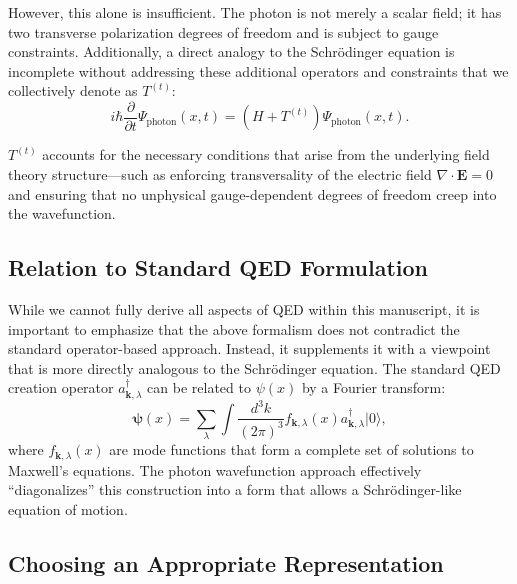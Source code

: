 \documentclass[aps,prl,twocolumn,showpacs,showkeys,superscriptaddress,amsmath,amssymb]{revtex4-2}
\begin{document}
However, this alone is insufficient. The photon is not merely a scalar field; it has two transverse polarization degrees of freedom and is subject to gauge constraints. Additionally, a direct analogy to the Schr\"odinger equation is incomplete without addressing these additional operators and constraints that we collectively denote as $T^{(t)}$:
\begin{equation}
i\hbar\frac{\partial}{\partial t}\Psi_{\text{photon}}(x,t) = (H + T^{(t)})\Psi_{\text{photon}}(x,t).
\end{equation}

$T^{(t)}$ accounts for the necessary conditions that arise from the underlying field theory structure—such as enforcing transversality of the electric field $\nabla\cdot\mathbf{E}=0$ and ensuring that no unphysical gauge-dependent degrees of freedom creep into the wavefunction.


\subsection{Relation to Standard QED Formulation}

While we cannot fully derive all aspects of QED within this manuscript, it is important to emphasize that the above formalism does not contradict the standard operator-based approach. Instead, it supplements it with a viewpoint that is more directly analogous to the Schr\"odinger equation. The standard QED creation operator $a^\dagger_{\mathbf{k},\lambda}$ can be related to $\psi(x)$ by a Fourier transform:
\begin{equation}
\bm{\psi}(x) = \sum_{\lambda}\int \frac{d^3k}{(2\pi)^3} f_{\mathbf{k},\lambda}(x) a^\dagger_{\mathbf{k},\lambda}|0\rangle,
\end{equation}
where $f_{\mathbf{k},\lambda}(x)$ are mode functions that form a complete set of solutions to Maxwell’s equations. The photon wavefunction approach effectively ``diagonalizes'' this construction into a form that allows a Schr\"odinger-like equation of motion.

\subsection{Choosing an Appropriate Representation}

\end{document}
